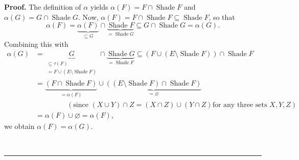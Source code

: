 \documentclass[numbers=enddot,12pt,final,onecolumn]{scrartcl}%
\theoremstyle{definition}
\newenvironment{proof}[1][Proof]{\noindent\textbf{#1.} }{\ \rule{0.5em}{0.5em}}
\begin{document}
\begin{proof}
The definition of $\alpha$ yields $\alpha\left(  F\right)  =F\cap
\operatorname*{Shade}F$ and $\alpha\left(  G\right)  =G\cap
\operatorname*{Shade}G$. Now, $\alpha\left(  F\right)  =F\cap
\operatorname*{Shade}F\subseteq\operatorname*{Shade}F$, so that
\[
\alpha\left(  F\right)  =\underbrace{\alpha\left(  F\right)  }_{\subseteq
G}\cap\underbrace{\operatorname*{Shade}F}_{=\operatorname*{Shade}G}\subseteq
G\cap\operatorname*{Shade}G=\alpha\left(  G\right)  .
\]
Combining this with%
\begin{align*}
\alpha\left(  G\right)   &  =\underbrace{G}_{\substack{\subseteq\tau\left(
F\right)  \\=F\cup\left(  E\setminus\operatorname*{Shade}F\right)  }%
}\cap\underbrace{\operatorname*{Shade}G}_{=\operatorname*{Shade}F}%
\subseteq\left(  F\cup\left(  E\setminus\operatorname*{Shade}F\right)
\right)  \cap\operatorname*{Shade}F\\
&  =\underbrace{\left(  F\cap\operatorname*{Shade}F\right)  }_{=\alpha\left(
F\right)  }\cup\underbrace{\left(  \left(  E\setminus\operatorname*{Shade}%
F\right)  \cap\operatorname*{Shade}F\right)  }_{=\varnothing}\\
&  \ \ \ \ \ \ \ \ \ \ \ \ \ \ \ \ \ \ \ \ \left(  \text{since }\left(  X\cup
Y\right)  \cap Z=\left(  X\cap Z\right)  \cup\left(  Y\cap Z\right)  \text{
for any three sets }X,Y,Z\right) \\
&  =\alpha\left(  F\right)  \cup\varnothing=\alpha\left(  F\right)  ,
\end{align*}
we obtain $\alpha\left(  F\right)  =\alpha\left(  G\right)  $.


\end{proof}
\end{document}
